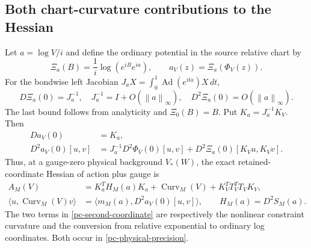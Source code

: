 \documentclass[11pt]{article}
\newcommand{\norm}[1]{\left\|#1\right\|}
\begin{document}
\subsection{Both chart-curvature contributions to the Hessian}
\label{pc-hessian-section}

Let $a=\log V/i$ and define the ordinary potential in the
source relative chart by
\begin{equation}\label{pc-ordinary-coordinates}
 \Xi_a(B)=\frac1i\log(e^{iB}e^{ia}),\qquad
 a_V(z)=\Xi_a(\Phi_V(z)).
\end{equation}
For the bondwise left Jacobian
$J_aX=\int_0^1\operatorname{Ad}(e^{ita})X\,dt$,
\begin{equation}\label{pc-log-jacobian}
 D\Xi_a(0)=J_a^{-1},\quad
 J_a^{-1}=I+O(\norm a_\infty),\quad D^2\Xi_a(0)=O(\norm a_\infty).
\end{equation}
The last bound follows from analyticity and $\Xi_0(B)=B$.
Put $K_a=J_a^{-1}K_V$. Then
\begin{equation}\label{pc-second-coordinate}
 \begin{split}
 Da_V(0)&=K_a,\\
 D^2a_V(0)[u,v]&=J_a^{-1}D^2\Phi_V(0)[u,v]
                 +D^2\Xi_a(0)[K_Vu,K_Vv].
 \end{split}
\end{equation}
Thus, at a gauge-zero physical background $V_*(W)$, the exact
retained-coordinate Hessian of action plus gauge is
\begin{equation}\label{pc-physical-precision}
 \begin{split}
 A_M(V)&=K_a^TH_M(a)K_a+\operatorname{Curv}_M(V)
                  +K_V^TT_V^TT_VK_V,\\
 \langle u,\operatorname{Curv}_M(V)v\rangle
      &=\langle m_M(a),D^2a_V(0)[u,v]\rangle,\qquad
 H_M(a)=D^2S_M(a).
 \end{split}
\end{equation}
The two terms in \eqref{pc-second-coordinate} are respectively
the nonlinear constraint curvature and the conversion from
relative exponential to ordinary log coordinates. Both occur
in \eqref{pc-physical-precision}.
\end{document}
